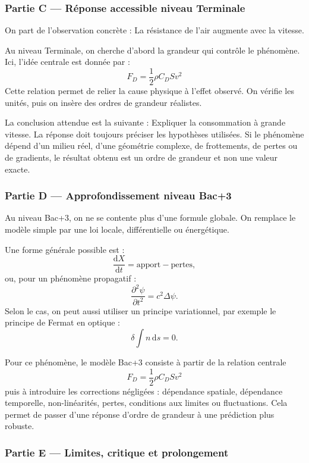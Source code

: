 \documentclass[11pt,a4paper]{article}
\begin{document}
\subsubsection*{Partie C — Réponse accessible niveau Terminale}

\begin{corrigebox}
On part de l'observation concrète : La résistance de l'air augmente avec la vitesse.

Au niveau Terminale, on cherche d'abord la grandeur qui contrôle le phénomène. Ici, l'idée centrale est donnée par :
\[
F_D=\frac12\rho C_DSv^2
\]
Cette relation permet de relier la cause physique à l'effet observé. On vérifie les unités, puis on insère des ordres de grandeur réalistes.

La conclusion attendue est la suivante : Expliquer la consommation à grande vitesse. La réponse doit toujours préciser les hypothèses utilisées. Si le phénomène dépend d'un milieu réel, d'une géométrie complexe, de frottements, de pertes ou de gradients, le résultat obtenu est un ordre de grandeur et non une valeur exacte.
\end{corrigebox}

\subsubsection*{Partie D — Approfondissement niveau Bac+3}

\begin{approfondissementbox}
Au niveau Bac+3, on ne se contente plus d'une formule globale. On remplace le modèle simple par une loi locale, différentielle ou énergétique.

Une forme générale possible est :
\[
\frac{\mathrm d X}{\mathrm dt}=\text{apport}-\text{pertes},
\]
ou, pour un phénomène propagatif :
\[
\frac{\partial^2 \psi}{\partial t^2}=c^2\Delta\psi.
\]
Selon le cas, on peut aussi utiliser un principe variationnel, par exemple le principe de Fermat en optique :
\[
\delta \int n\,\mathrm ds=0.
\]

Pour ce phénomène, le modèle Bac+3 consiste à partir de la relation centrale
\[
F_D=\frac12\rho C_DSv^2
\]
puis à introduire les corrections négligées : dépendance spatiale, dépendance temporelle, non-linéarités, pertes, conditions aux limites ou fluctuations. Cela permet de passer d'une réponse d'ordre de grandeur à une prédiction plus robuste.
\end{approfondissementbox}

\subsubsection*{Partie E — Limites, critique et prolongement}
\end{document}
